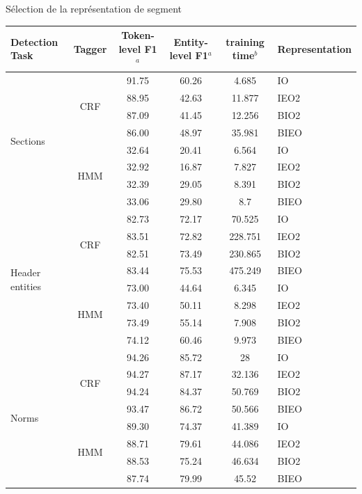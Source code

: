 \documentclass[newPxFont,pagenumber]{beamer}
\begin{document}
\begin{frame}{Sélection de la représentation de segment}
\tiny
\begin{tabular}{p{}|c|cccp{}}
\toprule
Detection Task & Tagger\hspace{0.1cm} & {Token-level F1$^a$}\hspace{0.1cm} & {Entity-level F1$^a$}\hspace{0.1cm} & training time$^b$\hspace{0.1cm} & Representation \\ 
\midrule
\multirow{8}{*}{Sections}  & \multirow{4}{*}{CRF} & 91.75 & 60.26 &  4.685  & IO \\
&  & 88.95 & 42.63  & 11.877 & IEO2 \\
&  & 87.09 & 41.45 & 12.256 & BIO2 \\
 &  & 86.00 & 48.97  & 35.981 & BIEO \\ \cline{2-6}
& \multirow{4}{*}{HMM} & 32.64 & 20.41 & 6.564 & IO \\
&  & 32.92 & 16.87  &   7.827  & IEO2 \\
 &  & 32.39 & 29.05 & 8.391 & BIO2 \\
  &  & 33.06 & 29.80 & 8.7 & BIEO \\ \hline %
\multirow{8}{*}{Header entities}  & \multirow{4}{*}{CRF} & 82.73 & 72.17  & 70.525 & IO \\
 &  & 83.51 & 72.82  & 228.751 & IEO2 \\
 &  & 82.51 & 73.49 & 230.865 & BIO2 \\
 &  & 83.44 & 75.53 &  475.249 & BIEO \\ \cline{2-6}
  & \multirow{4}{*}{HMM} & 73.00 & 44.64 & 6.345 & IO \\
  &  & 73.40 & 50.11& 8.298 & IEO2 \\ 
  &  & 73.49 & 55.14 & 7.908 & BIO2 \\
 &  & 74.12 & 60.46 & 9.973 & BIEO \\ \hline
\multirow{8}{*}{Norms}  & \multirow{4}{*}{CRF} & 94.26 & 85.72 & 28 & IO \\%
&  & 94.27 & 87.17 & 32.136 & IEO2 \\
 &  & 94.24 & 84.37 & 50.769 & BIO2 \\
  &  & 93.47 & 86.72 & 50.566 & BIEO \\ \cline{2-6}
  & \multirow{4}{*}{HMM} & 89.30 & 74.37 &  41.389 & IO \\%
   &  & 88.71 & 79.61 & 44.086 & IEO2 \\
  &  & 88.53 & 75.24 & 46.634 & BIO2 \\
  &  & 87.74 & 79.99 & 45.52& BIEO \\
\bottomrule
\end{tabular}
\end{frame}
\end{document}
